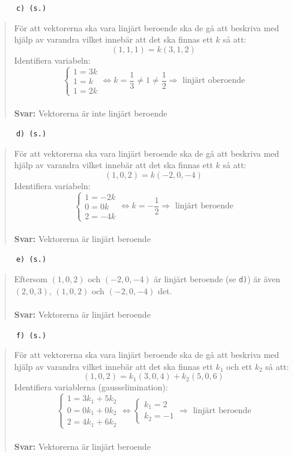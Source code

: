 \documentclass[a4paper]{article}
\newcommand{\tskcol}[1]{\textcolor{tskcol}{#1}}
\begin{document}
\texttt{\tskcol{~~~~~~c) (s.)}}
\begin{quotation}
	\noindent
	För att vektorerna ska vara linjärt beroende ska de gå att beskriva med hjälp av varandra vilket innebär att det ska finnas ett $k$ så att:
	\[(1,1,1)=k(3,1,2)\]
	Identifiera variabeln:
	\[\begin{cases}
	1=3k \\
	1=k \\
	1=2k
	\end{cases} \Leftrightarrow
	k=\frac{1}{3}\neq1\neq\frac{1}{2} \Rightarrow \text{ linjärt oberoende}\]
	\\
	\textbf{Svar:} Vektorerna är inte linjärt beroende
\end{quotation}

\texttt{\tskcol{~~~~~~d) (s.)}}
\begin{quotation}
	\noindent
	För att vektorerna ska vara linjärt beroende ska de gå att beskriva med hjälp av varandra vilket innebär att det ska finnas ett $k$ så att:
	\[(1,0,2)=k(-2,0,-4)\]
	Identifiera variabeln:
	\[\begin{cases}
	1=-2k \\
	0=0k \\
	2=-4k
	\end{cases} \Leftrightarrow
	k=-\frac{1}{2} \Rightarrow \text{ linjärt beroende}\]
	\\
	\textbf{Svar:} Vektorerna är linjärt beroende
\end{quotation}

\texttt{\tskcol{~~~~~~e) (s.)}}
\begin{quotation}
	\noindent
	Eftersom $(1,0,2)$ och $(-2,0,-4)$ är linjärt beroende (se \texttt{\tskcol{d)}}) är även $(2,0,3)$, $(1,0,2)$ och $(-2,0,-4)$ det.
	\\ \\
	\textbf{Svar:} Vektorerna är linjärt beroende
\end{quotation}

\texttt{\tskcol{~~~~~~f) (s.)}}
\begin{quotation}
	För att vektorerna ska vara linjärt beroende ska de gå att beskriva med hjälp av varandra vilket innebär att det ska finnas ett $k_1$ och ett $k_2$ så att:
	\[(1,0,2)=k_1(3,0,4)+k_2(5,0,6)\]
	Identifiera variablerna (gausselimination):
	\[\begin{cases}
	1=3k_1+5k_2 \\
	0=0k_1+0k_2 \\
	2=4k_1+6k_2
	\end{cases} \Leftrightarrow
	\begin{cases}
	k_1=2 \\
	k_2=-1
	\end{cases}\Rightarrow \text{ linjärt beroende}\]
	\\
	\textbf{Svar:} Vektorerna är linjärt beroende
\end{quotation}
\end{document}
